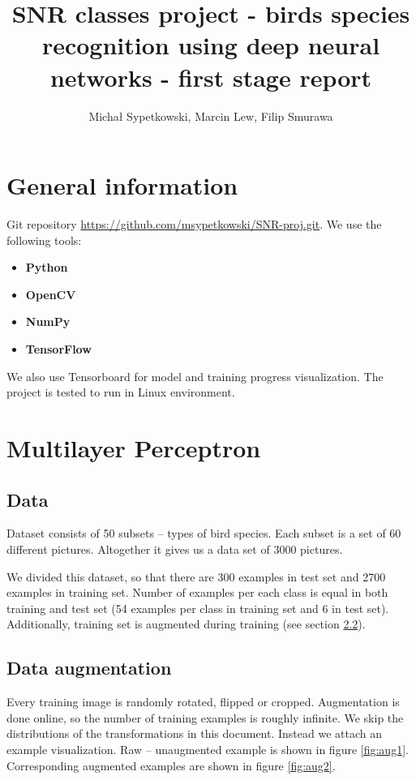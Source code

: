 \documentclass[a4paper]{article}
\begin{document}
\begin{titlepage}
\title{SNR classes project - birds species recognition using deep neural networks
- first stage report}

\author{Michał Sypetkowski, Marcin Lew, Filip Smurawa}
\maketitle
\end{titlepage}





\tableofcontents
{}
\newpage

\section{General information}
Git repository \url{https://github.com/msypetkowski/SNR-proj.git}.
We use the following tools:
\begin{itemize}
    \item \textbf{Python}\cite{Python}
    \item \textbf{OpenCV}\cite{OpenCV}
    \item \textbf{NumPy}\cite{NumPy}
    \item \textbf{TensorFlow}\cite{TensorFlow}
\end{itemize}
We also use Tensorboard for model and training progress visualization.
The project is tested to run in Linux environment.

\section{Multilayer Perceptron}

\subsection{Data}
Dataset consists of 50 subsets -- types of bird species.
Each subset is a set of 60 different pictures.
Altogether it gives us a data set of 3000 pictures.

We divided this dataset, so that there are 300 examples in test set and
2700 examples in training set.
Number of examples per each class is equal in both training and test set
(54 examples per class in training set and 6 in test set).
Additionally, training set is augmented during training (see section \ref{augmentation}).


\subsection{Data augmentation}
\label{augmentation}
Every training image is randomly rotated, flipped or cropped.
Augmentation is done online, so the number of training examples is
roughly infinite.
We skip the distributions of the transformations in this document.
Instead we attach an example visualization.
Raw -- unaugmented example is shown in figure \ref{fig:aug1}.
Corresponding augmented examples are shown in figure \ref{fig:aug2}.
\end{document}
